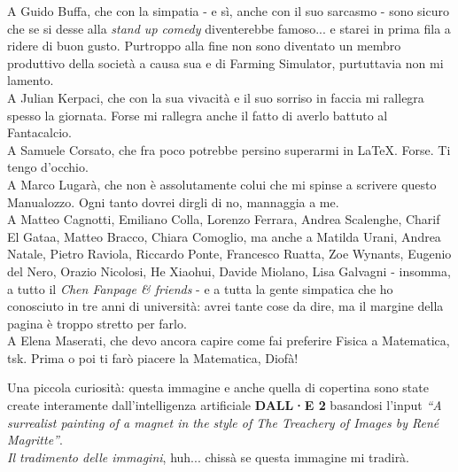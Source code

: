 A Guido Buffa, che con la simpatia - e sì, anche con il suo sarcasmo - sono sicuro che se si desse alla \textit{stand up comedy} diventerebbe famoso... e starei in prima fila a ridere di buon gusto. Purtroppo alla fine non sono diventato un membro produttivo della società a causa sua e di Farming Simulator, purtuttavia non mi lamento.\\
A Julian Kerpaci, che con la sua vivacità e il suo sorriso in faccia mi rallegra spesso la giornata. Forse mi rallegra anche il fatto di averlo battuto al Fantacalcio. \\
A Samuele Corsato, che fra poco potrebbe persino superarmi in \LaTeX. {\small Forse.} {\tiny Ti tengo d'occhio.}\\
A Marco Lugarà, che non è assolutamente colui che mi spinse a scrivere questo Manualozzo\texttrademark. {\small Ogni tanto dovrei dirgli di no, mannaggia a me.}\\
A Matteo Cagnotti, Emiliano Colla, Lorenzo Ferrara, Andrea Scalenghe, Charif El Gataa, Matteo Bracco, Chiara Comoglio, ma anche a Matilda Urani, Andrea Natale, Pietro Raviola, Riccardo Ponte, Francesco Ruatta, Zoe Wynants, Eugenio del Nero, Orazio Nicolosi, He Xiaohui, Davide Miolano, Lisa Galvagni - insomma, a tutto il \textit{Chen Fanpage \& friends} - e a tutta la gente simpatica che ho conosciuto in tre anni di università: avrei tante cose da dire, ma il margine della pagina è troppo stretto per farlo.\\
A Elena Maserati, che devo ancora capire come fai preferire Fisica a Matematica, tsk. Prima o poi ti farò piacere la Matematica, Diofà!
\begin{flushright}
	\textcolor{redill}{\href{https://www.youtube.com/watch?v=QXPZG9Gv75M}{}}
\end{flushright}
\vfill
\begin{center}
	\begin{frame}{}
	\end{frame}
\end{center}
\vspace{5pt}
\begin{center}
{\scriptsize Una piccola curiosità: questa immagine e anche quella di copertina sono state create interamente dall'intelligenza artificiale \textbf{DALL·E 2} basandosi l'input \textit{``A surrealist painting of a magnet in the style of The Treachery of Images by René Magritte''}.\\
\textit{Il tradimento delle immagini}, huh... chissà se questa immagine mi tradirà.}
\end{center}